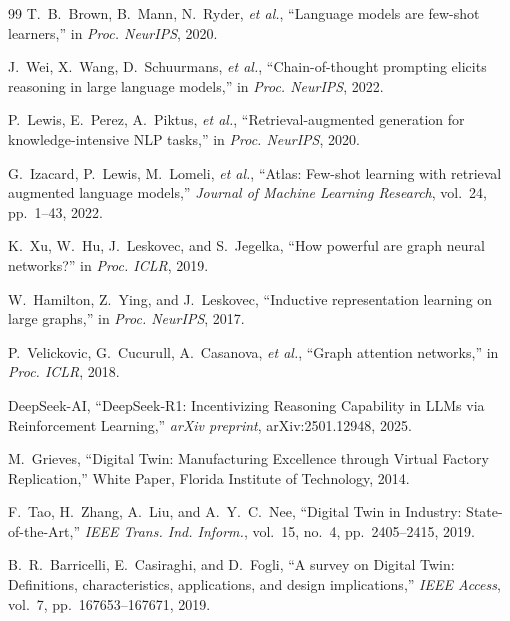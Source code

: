 \documentclass[preprint,times,numbers]{elsarticle}
\begin{document}
\begin{thebibliography}{99}
T.~B.~Brown, B.~Mann, N.~Ryder, \emph{et al.}, ``Language models are few-shot learners,'' in \textit{Proc. NeurIPS}, 2020.

J.~Wei, X.~Wang, D.~Schuurmans, \emph{et al.}, ``Chain-of-thought prompting elicits reasoning in large language models,'' in \textit{Proc. NeurIPS}, 2022.

P.~Lewis, E.~Perez, A.~Piktus, \emph{et al.}, ``Retrieval-augmented generation for knowledge-intensive NLP tasks,'' in \textit{Proc. NeurIPS}, 2020.

G.~Izacard, P.~Lewis, M.~Lomeli, \emph{et al.}, ``Atlas: Few-shot learning with retrieval augmented language models,'' \textit{Journal of Machine Learning Research}, vol.~24, pp.~1--43, 2022.

K.~Xu, W.~Hu, J.~Leskovec, and S.~Jegelka, ``How powerful are graph neural networks?'' in \textit{Proc. ICLR}, 2019.

W.~Hamilton, Z.~Ying, and J.~Leskovec, ``Inductive representation learning on large graphs,'' in \textit{Proc. NeurIPS}, 2017.

P.~Velickovic, G.~Cucurull, A.~Casanova, \emph{et al.}, ``Graph attention networks,'' in \textit{Proc. ICLR}, 2018.

DeepSeek-AI, ``DeepSeek-R1: Incentivizing Reasoning Capability in LLMs via Reinforcement Learning,'' \textit{arXiv preprint}, arXiv:2501.12948, 2025.



M.~Grieves, ``Digital Twin: Manufacturing Excellence through Virtual Factory Replication,'' White Paper, Florida Institute of Technology, 2014.

F.~Tao, H.~Zhang, A.~Liu, and A.~Y.~C.~Nee, ``Digital Twin in Industry: State-of-the-Art,'' \textit{IEEE Trans. Ind. Inform.}, vol.~15, no.~4, pp.~2405--2415, 2019.

B.~R.~Barricelli, E.~Casiraghi, and D.~Fogli, ``A survey on Digital Twin: Definitions, characteristics, applications, and design implications,'' \textit{IEEE Access}, vol.~7, pp.~167653--167671, 2019.


\end{thebibliography}
\end{document}

